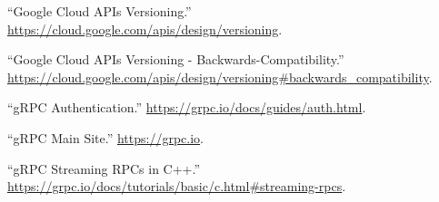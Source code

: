 \documentclass[11pt]{article}
\begin{document}
{{\begin{thebibliography}{44}
\mdbibitemlabel{{}[7]}\textquotedblleft{}Google Cloud APIs Versioning.\textquotedblright{} \href{https://cloud.google.com/apis/design/versioning}{{\ttfamily https://\hspace{0pt}cloud.\hspace{0pt}google.\hspace{0pt}com/\hspace{0pt}apis/\hspace{0pt}design/\hspace{0pt}versioning}}.\label{apiversioning}%

\mdbibitemlabel{{}[8]}\textquotedblleft{}Google Cloud APIs Versioning - Backwards-Compatibility.\textquotedblright{} \href{https://cloud.google.com/apis/design/versioning\%23backwards_compatibility}{{\ttfamily https://\hspace{0pt}cloud.\hspace{0pt}google.\hspace{0pt}com/\hspace{0pt}apis/\hspace{0pt}design/\hspace{0pt}versioning\#\hspace{0pt}backwards\_\hspace{0pt}compatibility}}.\label{apiversioningbackwardscompatibility}%

\mdbibitemlabel{{}[9]}\textquotedblleft{}gRPC Authentication.\textquotedblright{} \href{https://grpc.io/docs/guides/auth.html}{{\ttfamily https://\hspace{0pt}grpc.\hspace{0pt}io/\hspace{0pt}docs/\hspace{0pt}guides/\hspace{0pt}auth.\hspace{0pt}html}}.\label{grpcauth}%

\mdbibitemlabel{{}[10]}\textquotedblleft{}gRPC Main Site.\textquotedblright{} \href{https://grpc.io}{{\ttfamily https://\hspace{0pt}grpc.\hspace{0pt}io}}.\label{grpc}%

\mdbibitemlabel{{}[11]}\textquotedblleft{}gRPC Streaming RPCs in C++.\textquotedblright{} \href{https://grpc.io/docs/tutorials/basic/c.html\%23streaming-rpcs}{{\ttfamily https://\hspace{0pt}grpc.\hspace{0pt}io/\hspace{0pt}docs/\hspace{0pt}tutorials/\hspace{0pt}basic/\hspace{0pt}c.\hspace{0pt}html\#\hspace{0pt}streaming-\hspace{0pt}rpcs}}.\label{grpcstreamc}%


\end{thebibliography}}}
\end{document}
